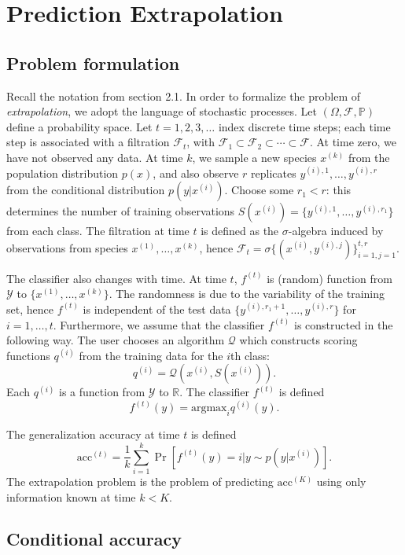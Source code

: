 \documentclass{article}
\newcommand{\argmax}{\text{argmax}}
\begin{document}
\section{Prediction Extrapolation}

\subsection{Problem formulation}

Recall the notation from section 2.1. In order to formalize the problem of \emph{extrapolation}, we
adopt the language of stochastic processes.  Let $(\Omega,
\mathcal{F}, \mathbb{P})$ define a probability space.  Let $t = 1, 2,
3, \hdots $ index discrete time steps; each time step is associated
with a filtration $\mathcal{F}_t$, with $\mathcal{F}_1 \subset
\mathcal{F}_2 \subset \cdots \subset \mathcal{F}$.  At time zero, we
have not observed any data.  At time $k$, we sample a new species
$x^{(k)}$ from the population distribution $p(x)$, and also observe
$r$ replicates $y^{(i), 1}, \hdots, y^{(i), r}$ from the conditional
distribution $p(y|x^{(i)})$.  Choose some $r_1 < r$: this determines
the number of training observations $S(x^{(i)}) = \{y^{(i), 1},\hdots,
y^{(i), r_1}\}$ from each class.  The filtration at time $t$ is
defined as the $\sigma$-algebra induced by observations from species
$x^{(1)}, \hdots, x^{(k)}$, hence $\mathcal{F}_t = \sigma\{(x^{(i)},
y^{(i), j})\}_{i=1, j=1}^{t, r}$.

The classifier also changes with time.  At time $t$, $f^{(t)}$ is
(random) function from $\mathcal{Y}$ to $\{x^{(1)}, \hdots,
x^{(k)}\}$.  The randomness is due to the variability of the training
set, hence $f^{(t)}$ is independent of the test data $\{y^{(i), r_1 +
  1}, \hdots, y^{(i), r}\}$ for $i = 1,\hdots, t$.  Furthermore, we
assume that the classifier $f^{(t)}$ is constructed in the following
way.  The user chooses an algorithm $\mathcal{Q}$ which constructs
scoring functions $q^{(i)}$ from the training data for the $i$th
class:
\[
q^{(i)} = \mathcal{Q}(x^{(i)}, S(x^{(i)})).
\]
Each $q^{(i)}$ is a function from $\mathcal{Y}$ to $\mathbb{R}$.  The
classifier $f^{(t)}$ is defined
\[
f^{(t)}(y) = \argmax_i q^{(i)}(y).
\]


The generalization accuracy at time $t$ is defined
\[
\text{acc}^{(t)} = \frac{1}{k}\sum_{i=1}^k \Pr[f^{(t)}(y) = i|y \sim p(y|x^{(i)})].
\]
The extrapolation problem is the problem of predicting $\text{acc}^{(K)}$ using
only information known at time $k < K$.

\subsection{Conditional accuracy}
\end{document}
